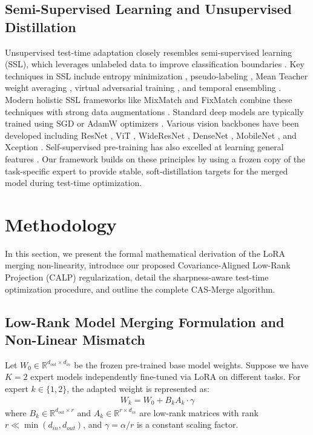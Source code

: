 \documentclass{article}
\begin{document}
\subsection{Semi-Supervised Learning and Unsupervised Distillation}
Unsupervised test-time adaptation closely resembles semi-supervised learning (SSL), which leverages unlabeled data to improve classification boundaries \cite{chapelle2006semi, zhu2005semi}. Key techniques in SSL include entropy minimization \cite{grandvalet2004semi}, pseudo-labeling \cite{lee2013pseudo}, Mean Teacher weight averaging \cite{tarvainen2017mean}, virtual adversarial training \cite{miyato2018virtual}, and temporal ensembling \cite{laine2016temporal}. Modern holistic SSL frameworks like MixMatch \cite{berthelot2019mixmatch} and FixMatch \cite{sohn2020fixmatch} combine these techniques with strong data augmentations \cite{cubuk2020randaugment, zhang2017mixup, yun2019cutmix, devries2017improved}. Standard deep models are typically trained using SGD or AdamW optimizers \cite{kingma2014adam, loshchilov2017decoupled, deng2009imagenet, szegedy2016inception, ioffe2015batchnorm, schmidt2018robustness, madry2017towards}. Various vision backbones have been developed including ResNet \cite{he2016resnet}, ViT \cite{dosovitskiy2020vit}, WideResNet \cite{zagoruyko2016wide}, DenseNet \cite{huang2016densely}, MobileNet \cite{howard2017mobilenets}, and Xception \cite{chollet2017xception}. Self-supervised pre-training has also excelled at learning general features \cite{asano2019selflabeling, caron2020unsupervised, grill2020byol, chen2020simple, he2020moco}. Our framework builds on these principles by using a frozen copy of the task-specific expert to provide stable, soft-distillation targets for the merged model during test-time optimization.

\section{Methodology}
\label{methodology}

In this section, we present the formal mathematical derivation of the LoRA merging non-linearity, introduce our proposed Covariance-Aligned Low-Rank Projection (CALP) regularization, detail the sharpness-aware test-time optimization procedure, and outline the complete CAS-Merge algorithm.

\subsection{Low-Rank Model Merging Formulation and Non-Linear Mismatch}
Let $W_0 \in \mathbb{R}^{d_{out} \times d_{in}}$ be the frozen pre-trained base model weights. Suppose we have $K=2$ expert models independently fine-tuned via LoRA on different tasks. For expert $k \in \{1, 2\}$, the adapted weight is represented as:
\begin{align}
W_k = W_0 + B_k A_k \cdot \gamma
\end{align}
where $B_k \in \mathbb{R}^{d_{out} \times r}$ and $A_k \in \mathbb{R}^{r \times d_{in}}$ are low-rank matrices with rank $r \ll \min(d_{in}, d_{out})$, and $\gamma = \alpha / r$ is a constant scaling factor.
\end{document}
